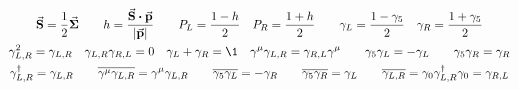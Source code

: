 \begin{gather*}
        \va{S} = \frac{1}{2}\va*{\Sigma}
        \qquad
        h
        = \frac{\va{S}\vdot\va{p}}{\abs{\va{p}}}
        \qquad
        P_L = \frac{1 - h}{2}
        \quad
        P_R = \frac{1 + h}{2}
        \qquad
        \gamma_L = \frac{1 - \gamma_5}{2}
        \quad
        \gamma_R = \frac{1 + \gamma_5}{2}
        \\
        \gamma_{L,R}^2 = \gamma_{L,R}
        \quad
        \gamma_{L,R}\gamma_{R,L} = 0
        \quad
        \gamma_L + \gamma_R = \1
        \quad
        \gamma^\mu\gamma_{L,R} = \gamma_{R,L}\gamma^\mu
        \qquad
        \gamma_5\gamma_{L} = -\gamma_{L}
        \qquad
        \gamma_5\gamma_{R} = \gamma_{R}
        \\
        \gamma_{L,R}^\dagger = \gamma_{L,R}
        \qquad
        \overline{\gamma^\mu\gamma_{L,R}} = \gamma^\mu\gamma_{L,R}
        \qquad
        \overline{\gamma_5\gamma_{L}} = -\gamma_{R}
        \qquad
        \overline{\gamma_5\gamma_{R}} = \gamma_{L}
        \qquad
        \overline{\gamma_{L,R}}
        = \gamma_0\gamma_{L,R}^\dagger\gamma_0
        = \gamma_{R,L}
\end{gather*}

